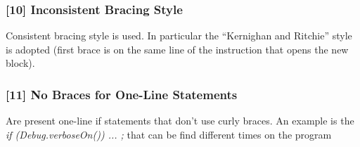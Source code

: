 \subsubsection{[10] Inconsistent Bracing Style}
Consistent bracing style is used. In particular the “Kernighan and Ritchie” style is adopted (first brace is on the same line of the instruction that opens the new block).

\subsubsection{[11] No Braces for One-Line Statements}
Are present one-line if statements that don't use curly braces. An example is the \textit{if (Debug.verboseOn()) ... ;} that can be find different times on the program